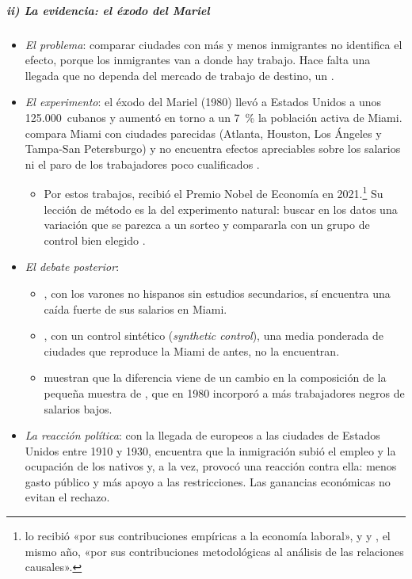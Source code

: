 \documentclass[11pt]{article}
\begin{document}
\subparagraph{ii) La evidencia: el éxodo del Mariel}

\begin{itemize}
\item \emph{El problema}: comparar ciudades con más y menos inmigrantes no identifica el efecto, porque los inmigrantes van a donde hay trabajo. Hace falta una llegada que no dependa del mercado de trabajo de destino, un  .
\item \emph{El experimento}: el éxodo del Mariel (1980) llevó a Estados Unidos a unos 125.000~cubanos y aumentó en torno a un 7~\% la población activa de Miami. \textcite{Card1990Impact} compara Miami con ciudades parecidas (Atlanta, Houston, Los Ángeles y Tampa-San Petersburgo) y no encuentra efectos apreciables sobre los salarios ni el paro de los trabajadores poco cualificados .
  \begin{itemize}
  \item Por estos trabajos,  recibió el Premio Nobel de Economía en 2021.\footnote{ lo recibió «por sus contribuciones empíricas a la economía laboral», y  y , el mismo año, «por sus contribuciones metodológicas al análisis de las relaciones causales»\nocite{Nobel2021CardAngristImbens}.} Su lección de método es la del experimento natural: buscar en los datos una variación que se parezca a un sorteo y compararla con un grupo de control bien elegido .
  \end{itemize}
\item \emph{El debate posterior}:
  \begin{itemize}
  \item \textcite{Borjas2017Wage}, con los varones no hispanos sin estudios secundarios, sí encuentra una caída fuerte de sus salarios en Miami.
  \item \textcite{PeriYasenov2019}, con un control sintético (\emph{synthetic control}), una media ponderada de ciudades que reproduce la Miami de antes, no la encuentran.
  \item \textcite{ClemensHunt2019} muestran que la diferencia viene de un cambio en la composición de la pequeña muestra de , que en 1980 incorporó a más trabajadores negros de salarios bajos.
  \end{itemize}
\item \emph{La reacción política}: con la llegada de europeos a las ciudades de Estados Unidos entre 1910 y 1930, \textcite{Tabellini2020Gifts} encuentra que la inmigración subió el empleo y la ocupación de los nativos y, a la vez, provocó una reacción contra ella: menos gasto público y más apoyo a las restricciones. Las ganancias económicas no evitan el rechazo.
\end{itemize}
\end{document}
